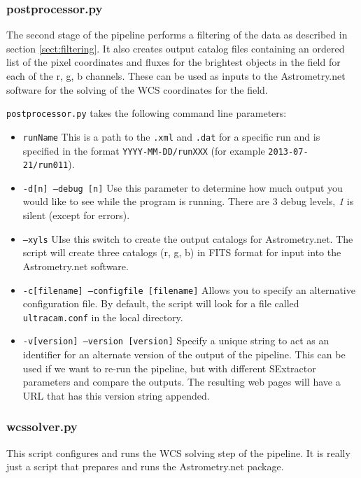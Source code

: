 \subsubsection{postprocessor.py}
The second stage of the pipeline performs a filtering of the data as described in section \ref{sect:filtering}. It also creates output catalog files containing an ordered list of the pixel coordinates and fluxes for the brightest objects in the field for each of the r, g, b channels. These can be used as inputs to the Astrometry.net software for the solving of the WCS coordinates for the field. 

\texttt{postprocessor.py} takes the following command line parameters:
\begin{itemize}
  \item \texttt{runName} This is a path to the \texttt{.xml} and \texttt{.dat} for a specific run and is specified in the format \texttt{YYYY-MM-DD/runXXX}  (for example \texttt{2013-07-21/run011}).
  \item \texttt{-d[n] --debug [n]} Use this parameter to determine how much output you would like to see while the program is running. There are 3 debug levels, \emph{1} is silent (except for errors).
  \item \texttt{--xyls} UIse this switch to create the output catalogs for Astrometry.net. The script will create three catalogs (r, g, b) in FITS format for input into the Astrometry.net software.
  \item \texttt{-c[filename] --configfile [filename]} Allows you to specify an alternative configuration file. By default, the script will look for a file called \texttt{ultracam.conf} in the local directory. 
  \item \texttt{-v[version] --version [version]} Specify a unique string to act as an identifier for an alternate version of the output of the pipeline. This can be used if we want to re-run the pipeline, but with different SExtractor parameters and compare the outputs. The resulting web pages will have a URL that has this version string appended.    
\end{itemize}

\subsubsection{wcssolver.py}
This script configures and runs the WCS solving step of the pipeline. It is really just a script that prepares and runs the Astrometry.net package. 

